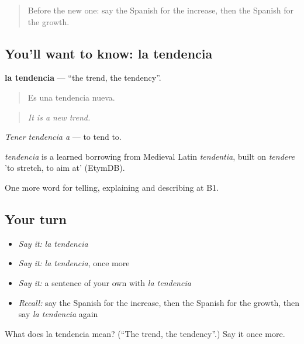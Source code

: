 \label{lesson:ES-C608-tendencia}



\begin{quote}
Before the new one: say the Spanish for the increase, then the Spanish for the growth.
\end{quote}

\subsection*{You'll want to know: la tendencia}
\textbf{la tendencia} — \textquotedblleft{}the trend, the tendency\textquotedblright{}.

\begin{quote}
Es una tendencia nueva.
\end{quote}

\begin{quote}
\emph{It is a new trend.}
\end{quote}

\emph{Tener tendencia a} — to tend to.

\begin{cousinweb}
\emph{tendencia} is a learned borrowing from Medieval Latin \emph{tendentia}, built on \emph{tendere} 'to stretch, to aim at' (EtymDB).
\end{cousinweb}

\begin{grammarlens}[title={What you've built}]
One more word for telling, explaining and describing at B1.
\end{grammarlens}

\subsection*{Your turn}
\begin{itemize}
\raggedright
  \item \emph{Say it:} \emph{la tendencia}
  \item \emph{Say it:} \emph{la tendencia}, once more
  \item \emph{Say it:} a sentence of your own with \emph{la tendencia}
  \item \emph{Recall:} say the Spanish for the increase, then the Spanish for the growth, then say \emph{la tendencia} again
\end{itemize}

\begin{tcolorbox}[breakable,colback=teal!4,colframe=teal!35!black,title={Before you move on}]
What does la tendencia mean? (\textquotedblleft{}The trend, the tendency\textquotedblright{}.) Say it once more.
\end{tcolorbox}
